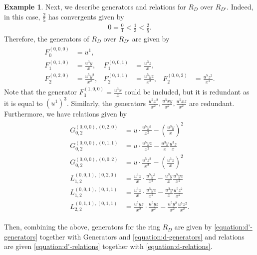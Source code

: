 \documentclass{amsart}
\theoremstyle{plain}
\theoremstyle{definition}
\newtheorem{example}[thm]{Example}
\theoremstyle{remark}
\numberwithin{equation}{subsection}
\begin{document}
\begin{example}
	Next, we describe generators and relations for $R_D$ over $R_{D'}$.
	Indeed, in this case, $\frac{2}{5}$ has convergents given by
	\begin{align*}
		0 = \frac{0}{1} < \frac{1}{3} < \frac{2}{5}.
	\end{align*}
	Therefore, the generators of $R_D$ over $R_{D'}$ are given by
	\begin{align}
		\begin{aligned}
		\label{equation:d-generators}
		F_0^{(0,0,0)} &= u^1, \\
		F_1^{(0,1,0)} &= \frac{u^3y}{x}, &F_1^{(0,0,1)} &= \frac{u^3z}{x}, \\
		F_2^{(0,2,0)} &= \frac{u^5y^2}{x^2}, &F_2^{(0,1,1)} &= \frac{u^5yz}{x^2}, &F_2^{(0,0,2)} &= \frac{u^5z^2}{x^2}.
	\end{aligned}
	\end{align}
Note that the generator $F_3^{(1,0,0)} = \frac{u^3x}{x}$ could be included, but it is redundant as it is equal to $(u^1)^3$.
	Similarly, the generators $\frac{u^5x^2}{x^2}, \frac{u^5xy}{x^2}, \frac{u^5xz}{x^2}$ are redundant.
	Furthermore, we have relations given by
	\begin{align}
		\begin{aligned}
		\label{equation:d-relations}
		G_{0,2}^{(0,0,0),(0,2,0)} &= u \cdot \frac{u^5 y^2}{x^2} - \left( \frac{u^3y}{x} \right)^2 \\
		G_{0,2}^{(0,0,0),(0,1,1)} &= u \cdot \frac{u^5 yz}{x^2} -  \frac{u^3y}{x} \frac{u^3z}{x} \\
		G_{0,2}^{(0,0,0),(0,0,2)} &= u \cdot \frac{u^5 z^2}{x^2} - \left( \frac{u^3z}{x} \right)^2 \\
		L_{1,2}^{(0,0,1), (0,2,0)} &= \frac{u^3z}{x}\cdot \frac{u^5y^2}{x^2} - \frac{u^3y}{x}\frac{u^5yz}{x^2} \\
		L_{1,2}^{(0,0,1), (0,1,1)} &= \frac{u^3z}{x}\cdot \frac{u^5yz}{x^2} - \frac{u^3y}{x}\frac{u^5z^2}{x^2} \\
		L_{2,2}^{(0,1,1),(0,1,1)} &= \frac{u^5yz}{x^2}\cdot \frac{u^5 yz}{x^2} - \frac{u^5y^2}{x^2}\frac{u^5z^2}{x^2}.
\end{aligned}
\end{align}

	Then, combining the above, generators for the ring $R_D$ are given by	
	\eqref{equation:d'-generators} together with
	Generators and \eqref{equation:d-generators}
	and relations are given
	\eqref{equation:d'-relations} together with \eqref{equation:d-relations}.
\end{example}
\end{document}

